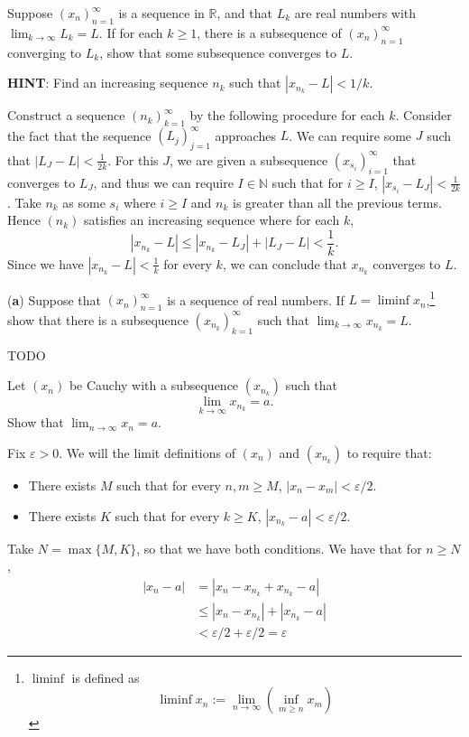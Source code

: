 \documentclass[../main.tex]{subfiles}
\begin{document}
\begin{problem}[\S2.7 I]
    Suppose $(x_n)_{n = 1}^\infty$ is a sequence in $\mathbb{R}$, and that $L_k$ are real numbers with $\lim_{k \to \infty} L_k = L$.
    If for each $k \ge 1$, there is a subsequence of $(x_n)_{n = 1}^\infty$ converging to $L_k$, show that some subsequence converges to $L$.

    \textbf{HINT}: Find an increasing sequence $n_k$ such that $|x_{n_k} - L| < 1/k$.
\end{problem}
Construct a sequence $(n_k)_{k = 1}^\infty$ by the following procedure for each $k$.
Consider the fact that the sequence $(L_j)_{j = 1}^\infty$ approaches $L$.
We can require some $J$ such that $|L_{J} - L| < \frac{1}{2k}$.
For this $J$, we are given a subsequence $(x_{s_{i}})_{i = 1}^\infty$ that converges to $L_J$, and thus we can require $I \in \mathbb{N}$ such that for $i \ge I$, $|x_{s_i} - L_J| < \frac{1}{2k}$.
Take $n_k$ as some $s_i$ where $i \ge I$ and $n_k$ is greater than all the previous terms.
Hence $(n_k)$ satisfies an increasing sequence where for each $k$,
\[
    |x_{n_k} - L| \le |x_{n_k} - L_J| + |L_J - L| < \frac{1}{k}.
\]
Since we have $|x_{n_k} - L| < \frac{1}{k}$ for every $k$, we can conclude that $x_{n_k}$ converges to $L$.

\begin{problem}[\S2.7 J]
    (\textbf{a}) Suppose that $(x_n)_{n = 1}^\infty$ is a sequence of real numbers.
    If $L = \liminf x_n$,\footnote{$\liminf$ is defined as
        \[ \liminf x_n := \lim_{n \to \infty} \left(\inf_{m \ge n} x_m\right) \]}
    show that there is a subsequence $(x_{n_k})_{k = 1}^\infty$ such that $\lim_{k \to \infty} x_{n_k} = L$.
\end{problem}
{\huge TODO}

\begin{problem}[\S2.8 A]
    Let $(x_n)$ be Cauchy with a subsequence $(x_{n_k})$ such that
    \[
        \lim_{k \to \infty} x_{n_k} = a.
    \]
    Show that $\lim_{n \to \infty} x_n = a$.
\end{problem}
Fix $\varepsilon > 0$.
We will the limit definitions of $(x_n)$ and $(x_{n_k})$ to require that:
\begin{itemize}
    \item There exists $M$ such that for every $n, m \ge M$, $|x_n - x_m| < \varepsilon/2$.
    \item There exists $K$ such that for every $k \ge K$, $|x_{n_k} - a| < \varepsilon/2$.
\end{itemize}
Take $N = \max\{ M, K \}$, so that we have both conditions.
We have that for $n \ge N$,
\begin{align*}
    |x_n - a|
    &= |x_n - x_{n_k} + x_{n_k} - a| \\
    &\le |x_n - x_{n_k}| + |x_{n_k} - a| \\
    & < \varepsilon/2 + \varepsilon/2 = \varepsilon
\end{align*}
\end{document}
